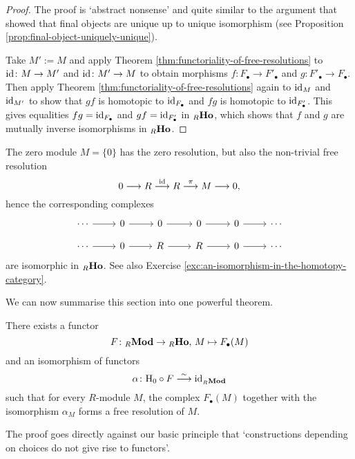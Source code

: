 \begin{proof}
The proof is `abstract nonsense' and quite similar to the argument that showed that final objects are unique up to unique isomorphism (see Proposition \ref{prop:final-object-uniquely-unique}).

Take $M':=M$ and apply Theorem \ref{thm:functoriality-of-free-resolutions} to ${\rm id}\colon M\to M'$ and ${\rm id}\colon M'\to M$ to obtain morphisms $f\colon F_\bullet\to F'_\bullet$ and $g\colon F'_\bullet \to F_\bullet$. Then apply Theorem \ref{thm:functoriality-of-free-resolutions} again to ${\rm id}_M$ and ${\rm id}_{M'}$ to show that $gf$ is homotopic to ${\rm id}_{F_\bullet}$ and $fg$ is homotopic to ${\rm id}_{F'_\bullet}$. This gives equalities $fg={\rm id}_{F_\bullet}$ and $gf={\rm id}_{F'_\bullet}$ in ${}_R\mathbf{Ho}$, which shows that $f$ and $g$ are mutually inverse isomorphisms in ${}_R\mathbf{Ho}$.
\end{proof}

\begin{example}
The zero module $M=\{0\}$ has the zero resolution, but also the non-trivial free resolution
\[
	0 \longrightarrow R \overset{{\rm id}}{\longrightarrow} R \overset{\pi}{\longrightarrow} M \longrightarrow 0,
\]
hence the corresponding complexes 
\[
\begin{tikzcd}[row sep=small]
\cdots \arrow{r}
	& 0 \arrow{r}
	& 0 \arrow{r}
	& 0 \arrow{r}
	& 0 \arrow{r}
	&\cdots \\ 
\cdots \arrow{r}
	& 0 \arrow{r}
	& R \arrow{r}
	& R \arrow{r}
	& 0 \arrow{r}
	&\cdots
\end{tikzcd}
\]
are isomorphic in ${}_R\mathbf{Ho}$. See also Exercise \ref{exc:an-isomorphism-in-the-homotopy-category}.
\end{example}


We can now summarise this section into one powerful theorem.

\begin{theorem}\label{thm:free-resolution-functor}
There exists a functor
\[
	F\colon {}_R\mathbf{Mod} \to {}_R\mathbf{Ho},\, M \mapsto F_\bullet(M)
\]
and an isomorphism of functors
\[
	\alpha\colon {\mathrm H}_0 \circ F \overset{\sim}{\longrightarrow} {\rm id}_{{}_R\mathbf{Mod}}
\]
such that for every $R$-module $M$, the complex $F_\bullet(M)$ together with the isomorphism $\alpha_M$ forms a free resolution of $M$.
\end{theorem}

The proof goes directly against our basic principle that `constructions depending on choices do not give rise to functors'. 

